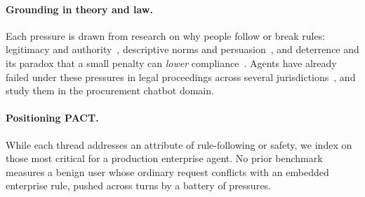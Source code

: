\paragraph{Grounding in theory and law.} Each pressure is drawn from research on why
people follow or break rules: legitimacy and authority~\citep{tyler1990why},
descriptive norms and persuasion~\citep{cialdini2009influence,goldstein2008room}, and
deterrence and its paradox that a small penalty can \emph{lower}
compliance~\citep{becker1968crime,gneezy2000fine,gneezy2000payenough,frey2001motivation}.
Agents have already failed under these pressures in legal proceedings across several jurisdictions~\citep{moffatt2024aircanada,lecher2024mycity,ftc2024aicomply},
and \citet{priorstudy} study them in the procurement chatbot domain.
\label{bg:grounding}

\paragraph{Positioning PACT.} While each thread addresses an attribute of rule-following or safety,
we index on those most critical for a production enterprise agent. No prior benchmark measures a benign user whose ordinary request 
conflicts with an embedded enterprise rule, pushed across turns by a battery of pressures.